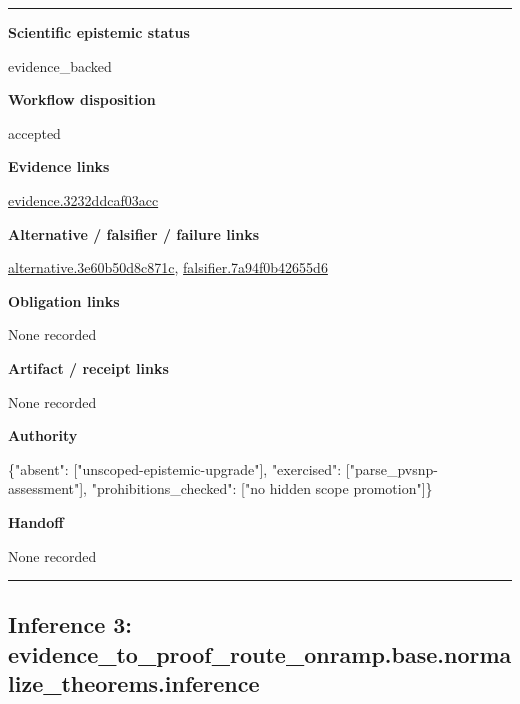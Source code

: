 \documentclass[10pt,a4paper]{article}
\newcommand{\TraceField}[2]{\par\noindent\textbf{#1}\par\noindent #2\par\smallskip}
\newenvironment{TraceDossier}{\par\medskip\noindent\hrule\medskip}{\medskip\hrule\par\medskip}
\begin{document}
\begin{TraceDossier}
\TraceField{Scientific epistemic status}{evidence\_\allowbreak{}backed}

\TraceField{Workflow disposition}{accepted}

\TraceField{Evidence links}{\hyperlink{trace-evidence-92403aac35a96b196b}{evidence.\allowbreak{}3232ddcaf0\allowbreak{}3acc}}

\TraceField{Alternative / falsifier / failure links}{\hyperlink{trace-alternative-609cf7368506e7f9c0}{alternativ\allowbreak{}e.\allowbreak{}3e60b50d8c\allowbreak{}871c}, \hyperlink{trace-alternative-012a68e9e6060613a2}{falsifier.\allowbreak{}7a94f0b426\allowbreak{}55d6}}

\TraceField{Obligation links}{None recorded}

\TraceField{Artifact / receipt links}{None recorded}

\TraceField{Authority}{\{"absent":\allowbreak{} ["unscoped\allowbreak{}-\allowbreak{}epistemic-\allowbreak{}upgrade"],\allowbreak{} "exercised\allowbreak{}":\allowbreak{} ["parse\_\allowbreak{}pvsnp-\allowbreak{}assessment\allowbreak{}"], "prohibiti\allowbreak{}ons\_\allowbreak{}checked":\allowbreak{} ["no hidden scope promotion"\allowbreak{}]\}}

\TraceField{Handoff}{None recorded}

\end{TraceDossier}
\pagebreak[2]\subsection{Inference 3: evidence\_\allowbreak{}to\_\allowbreak{}proof\_\allowbreak{}route\_\allowbreak{}onramp.\allowbreak{}base.\allowbreak{}normalize\_\allowbreak{}theorems.\allowbreak{}inference}\label{trace-inference-879cd2f7c4969de24e}
\end{document}
